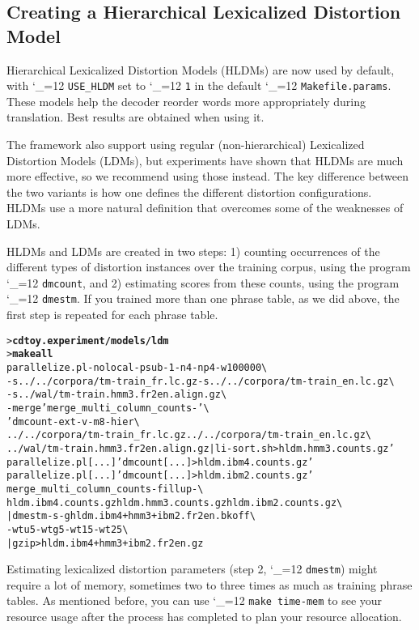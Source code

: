\documentclass[11pt,letterpaper]{article}
\newcommand{\bs}{\textbackslash{}}
\def\code{\begingroup\catcode`\_=12 \codex}
\newcommand{\codex}[1]{\texttt{#1}\endgroup}
\begin{document}
\subsection{Creating a Hierarchical Lexicalized Distortion Model} \label{LDM}

Hierarchical Lexicalized Distortion Models (HLDMs) are now used by default,
with \code{USE_HLDM} set to \code{1} in the default \code{Makefile.params}.
These models help the decoder reorder words more appropriately during
translation. Best results are obtained when using it.

The framework also support using regular (non-hierarchical) Lexicalized
Distortion Models (LDMs), but experiments have shown that HLDMs are much
more effective, so we recommend using those instead.  The key difference between
the two variants is how one defines the different distortion configurations.
HLDMs use a more natural definition that overcomes some of the weaknesses of
LDMs.

HLDMs and LDMs are created in two steps: 1) counting occurrences of the
different types of distortion instances over the training corpus, using the
program \code{dmcount}, and 2) estimating scores from these counts, using the
program \code{dmestm}.  If you trained more than one phrase table, as we did
above, the first step is repeated for each phrase table.
\begin{small}
\begin{alltt}
   > \textbf{cd toy.experiment/models/ldm}
   > \textbf{make all}
   parallelize.pl -nolocal -psub -1 -n 4 -np 4 -w 100000 \bs
      -s ../../corpora/tm-train_fr.lc.gz -s ../../corpora/tm-train_en.lc.gz \bs
      -s ../wal/tm-train.hmm3.fr2en.align.gz \bs
      -merge 'merge_multi_column_counts -' \bs
      'dmcount -ext -v -m 8 -hier \bs
         ../../corpora/tm-train_fr.lc.gz ../../corpora/tm-train_en.lc.gz \bs
         ../wal/tm-train.hmm3.fr2en.align.gz | li-sort.sh > hldm.hmm3.counts.gz'
   parallelize.pl [...] 'dmcount [...] > hldm.ibm4.counts.gz'
   parallelize.pl [...] 'dmcount [...] > hldm.ibm2.counts.gz'
   merge_multi_column_counts -fillup - \bs
      hldm.ibm4.counts.gz hldm.hmm3.counts.gz hldm.ibm2.counts.gz \bs
      | dmestm -s -g hldm.ibm4+hmm3+ibm2.fr2en.bkoff \bs
        -wtu 5 -wtg 5 -wt1 5 -wt2 5 \bs
      | gzip > hldm.ibm4+hmm3+ibm2.fr2en.gz
\end{alltt}
\end{small}

Estimating lexicalized distortion parameters (step 2, \code{dmestm}) might
require a lot of memory, sometimes two to three times as much as training
phrase tables.  As mentioned before, you can use \code{make time-mem} to see
your resource usage after the process has completed to plan your resource
allocation.
\end{document}
